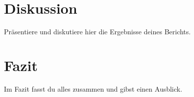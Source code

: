 \documentclass[a4paper, 12pt]{article}
\begin{document}

\newpage
\section{Diskussion}
Präsentiere und diskutiere hier die Ergebnisse deines Berichts.

\newpage
\section{Fazit} %
Im Fazit fasst du alles zusammen und gibst einen Ausblick.

\newpage


\end{document}
